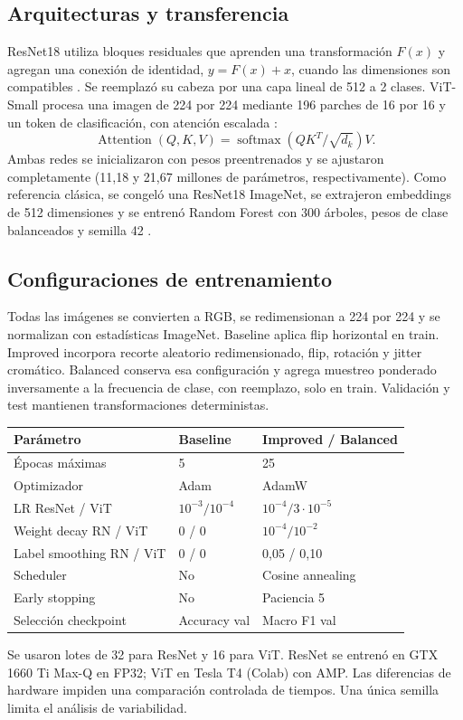 \documentclass[10pt,a4paper]{article}
\begin{document}
\subsection{Arquitecturas y transferencia}
ResNet18 utiliza bloques residuales que aprenden una transformación $F(x)$ y agregan una conexión de identidad, $y=F(x)+x$, cuando las dimensiones son compatibles \cite{he}. Se reemplazó su cabeza por una capa lineal de 512 a 2 clases. ViT-Small procesa una imagen de 224 por 224 mediante 196 parches de 16 por 16 y un token de clasificación, con atención escalada \cite{dosovitskiy}: 
\[\operatorname{Attention}(Q,K,V)=\operatorname{softmax}(QK^T/\sqrt{d_k})V.\]
Ambas redes se inicializaron con pesos preentrenados y se ajustaron completamente (11,18 y 21,67 millones de parámetros, respectivamente). Como referencia clásica, se congeló una ResNet18 ImageNet, se extrajeron embeddings de 512 dimensiones y se entrenó Random Forest con 300 árboles, pesos de clase balanceados y semilla 42 \cite{breiman}.
\subsection{Configuraciones de entrenamiento}
Todas las imágenes se convierten a RGB, se redimensionan a 224 por 224 y se normalizan con estadísticas ImageNet. Baseline aplica flip horizontal en train. Improved incorpora recorte aleatorio redimensionado, flip, rotación y jitter cromático. Balanced conserva esa configuración y agrega muestreo ponderado inversamente a la frecuencia de clase, con reemplazo, solo en train. Validación y test mantienen transformaciones deterministas.
\begin{center}\small
\begin{tabular}{lll}\toprule Parámetro & Baseline & Improved / Balanced\\\midrule Épocas máximas &5&25\\ Optimizador &Adam&AdamW\\ LR ResNet / ViT &$10^{-3}/10^{-4}$&$10^{-4}/3\cdot10^{-5}$\\ Weight decay RN / ViT &0 / 0&$10^{-4}/10^{-2}$\\ Label smoothing RN / ViT &0 / 0&0,05 / 0,10\\ Scheduler &No&Cosine annealing\\ Early stopping &No&Paciencia 5\\ Selección checkpoint &Accuracy val&Macro F1 val\\\bottomrule\end{tabular}
\end{center}
Se usaron lotes de 32 para ResNet y 16 para ViT. ResNet se entrenó en GTX 1660 Ti Max-Q en FP32; ViT en Tesla T4 (Colab) con AMP. Las diferencias de hardware impiden una comparación controlada de tiempos. Una única semilla limita el análisis de variabilidad.
\newpage
\end{document}
